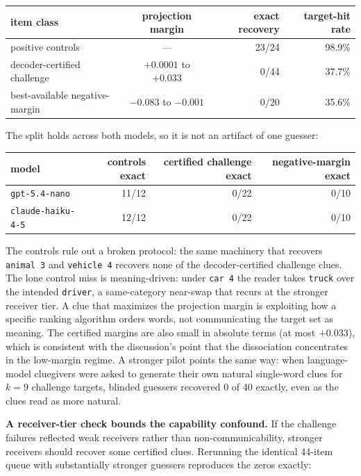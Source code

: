 \documentclass[11pt]{article}
\begin{document}
\begin{center}
\begin{tabular}{lcrr}
\toprule
item class & projection margin & exact recovery & target-hit rate \\
\midrule
positive controls & --- & 23/24 & 98.9\% \\
decoder-certified challenge & $+0.0001$ to $+0.033$ & 0/44 & 37.7\% \\
best-available negative-margin & $-0.083$ to $-0.001$ & 0/20 & 35.6\% \\
\bottomrule
\end{tabular}
\end{center}

The split holds across both models, so it is not an artifact of one guesser:

\begin{center}
\begin{tabular}{lrrr}
\toprule
model & controls exact & certified challenge exact & negative-margin exact \\
\midrule
\texttt{gpt-5.4-nano}   & 11/12 & 0/22 & 0/10 \\
\texttt{claude-haiku-4-5} & 12/12 & 0/22 & 0/10 \\
\bottomrule
\end{tabular}
\end{center}

The controls rule out a broken protocol: the same machinery that recovers
\texttt{animal 3} and \texttt{vehicle 4} recovers none of the decoder-certified
challenge clues. The lone control miss is meaning-driven: under \texttt{car 4} the reader takes
\texttt{truck} over the intended \texttt{driver}, a same-category near-swap that
recurs at the stronger receiver tier. A clue that maximizes the projection margin is exploiting how a
specific ranking algorithm orders words, not communicating the target set as
meaning. The certified margins are also small in absolute terms (at most
$+0.033$), which is consistent with the discussion's point that the dissociation
concentrates in the low-margin regime. A stronger pilot points the same way: when
language-model cluegivers were asked to generate their own natural single-word
clues for $k = 9$ challenge targets, blinded guessers recovered 0 of 40 exactly,
even as the clues read as more natural.

\textbf{A receiver-tier check bounds the capability confound.} If the challenge
failures reflected weak receivers rather than non-communicability, stronger
receivers should recover some certified clues. Rerunning the identical 44-item
queue with substantially stronger guessers reproduces the zeros exactly:
\end{document}
